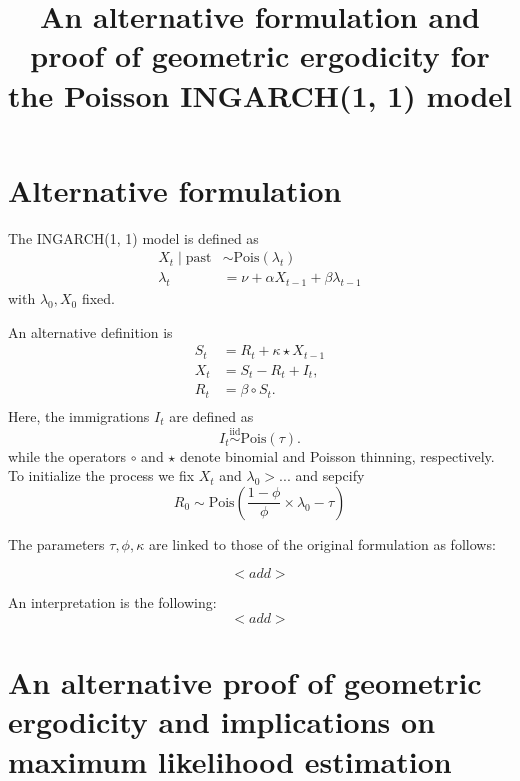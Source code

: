 \documentclass[10pt,a4paper]{article}
\begin{document}
\title{An alternative formulation and proof of geometric ergodicity for the Poisson INGARCH(1, 1) model}

\maketitle


\section{Alternative formulation}

The INGARCH(1, 1) model is defined as
\begin{align*}
X_t \mid \text{past} & \sim \text{Pois}(\lambda_t)\\
\lambda_t & = \nu + \alpha X_{t - 1} + \beta \lambda_{t - 1}
\end{align*}
with $\lambda_0, X_0$ fixed.

An alternative definition is
\begin{align*}
S_t & = R_t + \kappa \star X_{t - 1}\\
X_t & = S_t - R_t + I_t,\\
R_t & = \beta \circ S_{t}.\\
\end{align*}
Here, the immigrations $I_t$ are defined as
$$
I_t \stackrel{\text{iid}}{\sim} \text{Pois}(\tau).
$$
while the operators $\circ$ and $\star$ denote binomial and Poisson thinning, respectively. To initialize the process we fix $X_t$ and $\lambda_0 > ...$ and sepcify
$$
R_0 \sim \text{Pois}\left(\frac{1 - \phi}{\phi} \times \lambda_0 - \tau \right)
$$

The parameters $\tau, \phi, \kappa$ are linked to those of the original formulation as follows:

$$
<add>
$$

An interpretation is the following:
$$
<add>
$$

\section{An alternative proof of geometric ergodicity and implications on maximum likelihood estimation}
\end{document}
